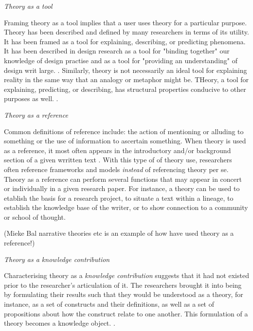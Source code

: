 \par \emph{Theory as a tool} \par

Framing theory as a tool implies that a user uses theory for a particular purpose. Theory has been described and defined by many researchers in terms of its utility. It has been framed as a tool for explaining, describing, or predicting phenomena. It has been described in design research as a tool for "binding together" our knowledge of design practise and as a tool for "providing an understanding" of design writ large. \autocite[p. 127]{beck_examining_2016}. Similarly, theory is not necessarily an ideal tool for explaining reality in the same way that an analogy or metaphor might be. THeory, a tool for explaining, predicting, or describing, has structural properties conducive to other purposes as well. \autocite[p. 127]{beck_examining_2016}.


\par \emph{Theory as a reference} \par
Common definitions of reference include: the action of mentioning or alluding to something or the use of information to ascertain something. When theory is used as a reference, it most often appears in the introductory and/or background section of a given wrritten text \autocite[p. 128]{beck_examining_2016}. With this type of of theory use, researchers often reference frameworks and models \emph{instead} of referencing theory per se. Theory as a reference can perform several functions that may appear in concert or individually in a given research paper. For instance, a theory can be used to etablish the basis for a research project, to situate a text within a lineage, to establish the knowledge base of the writer, or to show connection to a community or school of thought. 
\par
(Mieke Bal narrative theories etc is an example of how  have used theory as a reference!)

\par \emph{Theory as a knowledge contribution} \par
Characterising theory as a \emph{knowledge contribution} suggests that it had not existed prior to the researcher's articulation of it. The researchers brought it into being by formulating their results such that they would be understood as a theory, for instance, as a set of constructs and their definitions, as well as a set of propositions about how the construct relate to one another. This formulation of a theory becomes a knowledge object. \autocite[p. 128]{beck_examining_2016}.



